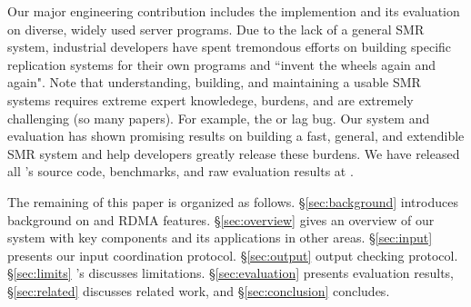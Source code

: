Our major engineering contribution includes the \xxx implemention and its 
evaluation on \nprog diverse, widely used server programs. Due to the lack of a 
general SMR system, industrial developers have spent tremondous efforts on 
building specific replication systems for their own programs and ``invent the 
wheels again and again". Note that understanding, building, and maintaining a 
usable SMR systems requires extreme expert knowledege, burdens, and are 
extremely challenging (so many \paxos papers). For example, the \redis or 
\memcached lag bug. Our \xxx system and evaluation has shown promising results 
on building a fast, general, and extendible SMR system and help developers 
greatly release these burdens. We have released all \xxx's source code, 
benchmarks, and raw evaluation results at \github.

The remaining of this paper is organized as follows. \S\ref{sec:background} 
introduces background on \paxos and RDMA features. \S\ref{sec:overview} gives 
an overview of our \xxx system with key components and its applications in 
other areas. \S\ref{sec:input} presents our input coordination protocol. 
\S\ref{sec:output} output checking protocol. \S\ref{sec:limits} \xxx's 
discusses limitations. \S\ref{sec:evaluation} presents evaluation results, 
\S\ref{sec:related} discusses related work, and \S\ref{sec:conclusion} 
concludes.   